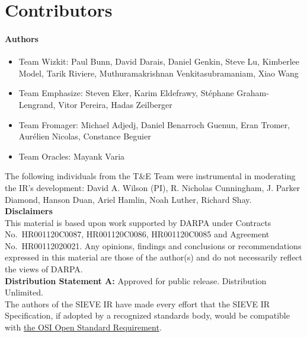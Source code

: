 
\section{Contributors}\label{contributors}

\paragraph{Authors}
\begin{itemize}
    \item Team Wizkit: Paul Bunn, David Darais, Daniel Genkin, Steve Lu, Kimberlee Model, Tarik Riviere, Muthuramakrishnan Venkitasubramaniam, Xiao Wang
    \item Team Emphasize:
    Steven Eker, Karim Eldefrawy, Stéphane Graham-Lengrand, Vitor Pereira, Hadas Zeilberger 
    \item Team Fromager: Michael Adjedj, Daniel Benarroch Guenun, Eran Tromer, Aurélien Nicolas, Constance Beguier
    \item Team Oracles: Mayank Varia
\end{itemize}

The following individuals from the T\&E Team were instrumental in moderating the IR's development:
David A. Wilson (PI),
R. Nicholas Cunningham,
J. Parker Diamond,
Hanson Duan,
Ariel Hamlin,
Noah Luther,
Richard Shay.\\

\noindent\textbf{Disclaimers}
\\

This material is based upon work supported by DARPA under Contracts No.~HR001120C0087, HR001120C0086, HR001120C0085 and Agreement No.~HR00112020021.  Any opinions, findings and conclusions or recommendations expressed in this material are those of the author(s) and do not necessarily reflect the views of DARPA.\\

\textbf{Distribution Statement A:} Approved for public release. Distribution Unlimited.\\

The authors of the SIEVE IR have made every effort that the SIEVE IR Specification, if adopted by a recognized standards body, would be compatible with \href{https://opensource.org/osr}{the OSI Open Standard Requirement}.

